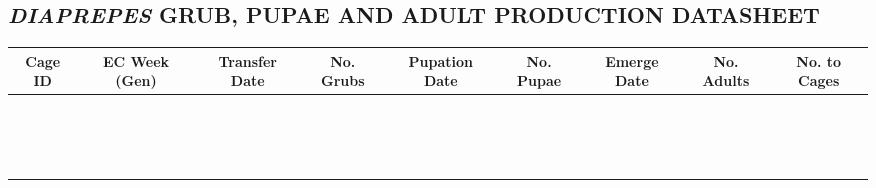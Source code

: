 \documentclass{sop_class}[overrideChapters] %
\begin{document}
{\begin{landscape}
\section{\textit{DIAPREPES} GRUB, PUPAE AND ADULT PRODUCTION DATASHEET}\label{grub-adult-datasheet}
\begin{table}[!htbp]
    \centering
    \setlength{\tabcolsep}{0.5em}
      \begin{threeparttable}
              \begin{tabular}{|c|c|c|c|c|c|c|c|c|}
            \toprule
            {Cage ID} & {EC Week (Gen)} & {Transfer Date} & {No. Grubs} & {Pupation Date} & {No. Pupae} & {Emerge Date} & {No. Adults} & {No. to Cages}\\
            \hline
            {} & {} & {} & {} & {} & {} & {} & {} & {}\\
            \hline
            {} & {} & {} & {} & {} & {} & {} & {} & {}\\
            \hline
            {} & {} & {} & {} & {} & {} & {} & {} & {}\\
            \hline
            {} & {} & {} & {} & {} & {} & {} & {} & {}\\
            \hline
            {} & {} & {} & {} & {} & {} & {} & {} & {}\\
            \hline
            {} & {} & {} & {} & {} & {} & {} & {} & {}\\
            \hline
            {} & {} & {} & {} & {} & {} & {} & {} & {}\\
            \hline
            {} & {} & {} & {} & {} & {} & {} & {} & {}\\
            \hline
            {} & {} & {} & {} & {} & {} & {} & {} & {}\\
            \hline
            {} & {} & {} & {} & {} & {} & {} & {} & {}\\
            \hline
            {} & {} & {} & {} & {} & {} & {} & {} & {}\\
            \hline
            {} & {} & {} & {} & {} & {} & {} & {} & {}\\
            \hline
            {} & {} & {} & {} & {} & {} & {} & {} & {}\\
            \hline
            {} & {} & {} & {} & {} & {} & {} & {} & {}\\
            \hline
            {} & {} & {} & {} & {} & {} & {} & {} & {}\\
            \hline
            {} & {} & {} & {} & {} & {} & {} & {} & {}\\

\end{tabular}
\end{threeparttable}
\end{table}
\end{landscape}}
\end{document}
